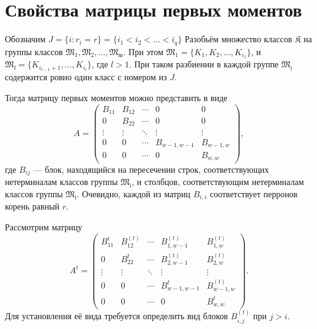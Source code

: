 \documentclass[11pt]{article}
\begin{document}
\section{Свойства матрицы первых моментов}

Обозначим $J = \{ i : r_i = r \} = \{ i_1 < i_2 < \ldots < i_q \}$ Разобьём множество классов $\mathfrak{K}$ на группы классов $\mathfrak{M_1}, \mathfrak{M_2}, \ldots, \mathfrak{M_w}$. При этом $\mathfrak{M_1} = \{K_1, K_2, \ldots, K_{i_1} \}$, и $\mathfrak{M_l} = \{ K_{i_{l-1} + 1}, \ldots, K_{i_l} \}$, где $l > 1$. При таком разбиении в каждой группе $\mathfrak{M_j}$ содержится ровно один класс с номером из $J$.

Тогда матрицу первых моментов можно представить в виде
\begin{equation}
    A = 
    \begin{pmatrix}
        B_{11} & B_{12} & \cdots & 0 & 0 \\
        0 & B_{22} & \cdots & 0 & 0 \\
        \vdots & \vdots & \ddots & \vdots & \vdots \\
        0 & 0 & \cdots & B_{w-1,w-1} & B_{w-1,w} \\
        0 & 0 & \cdots & 0 & B_{w,w}
    \end{pmatrix},
\end{equation}
где $B_{ij}$ --- блок, находящийся на пересечении строк, соответствующих нетерминалам классов группы $\mathfrak{M_i}$, и столбцов, соответствующим нетерминалам классов группы $\mathfrak{M_j}$. Очевидно, каждой из матриц $B_{i,i}$ соответствует перронов корень равный $r$.

Рассмотрим матрицу
\begin{equation}
    A^t = 
    \begin{pmatrix}
        B_{11}^t & B_{12}^{(t)} & \cdots & B_{1,w-1}^{(t)} & B_{1,w}^{(t)} \\
        0 & B_{22}^t & \cdots & B_{2,w-1}^{(t)} & B_{2,w}^{(t)} \\
        \vdots & \vdots & \ddots & \vdots & \vdots \\
        0 & 0 & \cdots & B_{w-1,w-1}^t & B_{w-1,w}^{(t)} \\
        0 & 0 & \cdots & 0 & B_{w,w}^t
    \end{pmatrix}.
\end{equation}
Для установления её вида требуется определить вид блоков $B_{i,j}^{(t)}$ при $j > i$.
\end{document}
